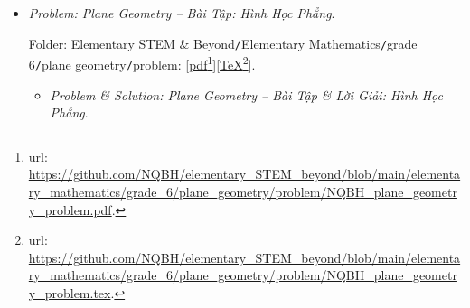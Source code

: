 \documentclass[12pt]{article}
\begin{document}
\begin{itemize}
	Folder: {\sf Elementary STEM \& Beyond{\tt/}Elementary Mathematics{\tt/}grade 6{\tt/}fraction, decimal{\tt/}problem}: [\href{https://github.com/NQBH/elementary_STEM_beyond/blob/main/elementary_mathematics/grade_6/fraction_decimal/problem/NQBH_fraction_decimal_problem.pdf}{pdf}\footnote{{\sc url}: \url{https://github.com/NQBH/elementary_STEM_beyond/blob/main/elementary_mathematics/grade_6/fraction_decimal/problem/NQBH_fraction_decimal_problem.pdf}.}][\href{https://github.com/NQBH/elementary_STEM_beyond/blob/main/elementary_mathematics/grade_6/fraction_decimal/problem/NQBH_fraction_decimal_problem.tex}{\TeX}\footnote{{\sc url}: \url{https://github.com/NQBH/elementary_STEM_beyond/blob/main/elementary_mathematics/grade_6/fraction_decimal/problem/NQBH_fraction_decimal_problem.tex}.}].
	\begin{itemize}
		\item {\it Problem \& Solution: Fraction \& Decimal -- Bài Tập \& Lời Giải: Phân Số {\it\&} Số Thập Phân}.
		
		Folder: {\sf Elementary STEM \& Beyond{\tt/}Elementary Mathematics{\tt/}grade 6{\tt/}fraction, decimal{\tt/}solution}: [\href{https://github.com/NQBH/elementary_STEM_beyond/blob/main/elementary_mathematics/grade_6/fraction_decimal/solution/NQBH_fraction_decimal_solution.pdf}{pdf}\footnote{{\sc url}: \url{https://github.com/NQBH/elementary_STEM_beyond/blob/main/elementary_mathematics/grade_6/fraction_decimal/solution/NQBH_fraction_decimal_solution.pdf}.}][\href{https://github.com/NQBH/elementary_STEM_beyond/blob/main/elementary_mathematics/grade_6/fraction_decimal/solution/NQBH_fraction_decimal_solution.tex}{\TeX}\footnote{{\sc url}: \url{https://github.com/NQBH/elementary_STEM_beyond/blob/main/elementary_mathematics/grade_6/fraction_decimal/solution/NQBH_fraction_decimal_solution.tex}.}].
	\end{itemize}
	\item {\it Problem: Plane Geometry -- Bài Tập: Hình Học Phẳng}.
	
	Folder: {\sf Elementary STEM \& Beyond{\tt/}Elementary Mathematics{\tt/}grade 6{\tt/}plane geometry{\tt/}problem}: [\href{https://github.com/NQBH/elementary_STEM_beyond/blob/main/elementary_mathematics/grade_6/plane_geometry/problem/NQBH_plane_geometry_problem.pdf}{pdf}\footnote{{\sc url}: \url{https://github.com/NQBH/elementary_STEM_beyond/blob/main/elementary_mathematics/grade_6/plane_geometry/problem/NQBH_plane_geometry_problem.pdf}.}][\href{https://github.com/NQBH/elementary_STEM_beyond/blob/main/elementary_mathematics/grade_6/plane_geometry/problem/NQBH_plane_geometry_problem.tex}{\TeX}\footnote{{\sc url}: \url{https://github.com/NQBH/elementary_STEM_beyond/blob/main/elementary_mathematics/grade_6/plane_geometry/problem/NQBH_plane_geometry_problem.tex}.}].
	\begin{itemize}
		\item {\it Problem \& Solution: Plane Geometry -- Bài Tập \& Lời Giải: Hình Học Phẳng}.
		

\end{itemize}
\end{itemize}
\end{document}
